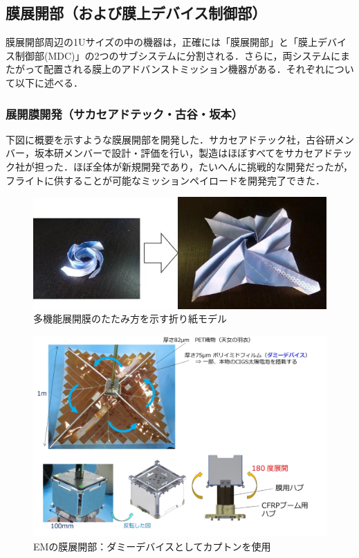\subsection{膜展開部（および膜上デバイス制御部）}

膜展開部周辺の1Uサイズの中の機器は，正確には「膜展開部」と「膜上デバイス制御部(MDC)」の2つのサブシステムに分割される．さらに，両システムにまたがって配置される膜上のアドバンストミッション機器がある．それぞれについて以下に述べる．

\subsubsection{展開膜開発（サカセアドテック・古谷・坂本）}

下図に概要を示すような膜展開部を開発した．サカセアドテック社，古谷研メンバー，坂本研メンバーで設計・評価を行い，製造はほぼすべてをサカセアドテック社が担った．ほぼ全体が新規開発であり，たいへんに挑戦的な開発だったが，フライトに供することが可能なミッションペイロードを開発完了できた．
\begin{figure}[H]
	\centering
	\includegraphics[width=.5\textwidth]{03/fig/3-9-3-1-4.jpg}
	\caption{多機能展開膜のたたみ方を示す折り紙モデル}
	\label{fig3-9-3-1-4}
\end{figure}
\begin{figure}[H]
	\centering
	\includegraphics[width=.8\textwidth]{03/fig/3-9-3-1-1.jpg}
	\caption{EMの膜展開部：ダミーデバイスとしてカプトンを使用}
	\label{fig3-9-3-1-1}
\end{figure}
